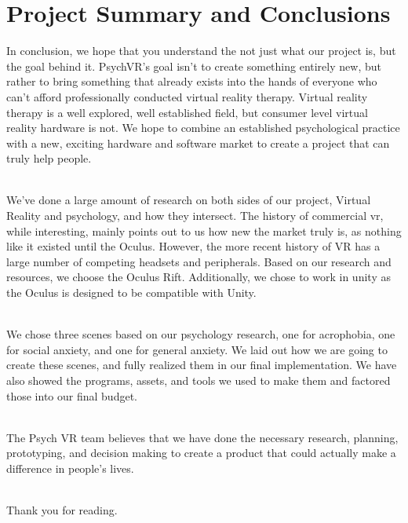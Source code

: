 \documentclass[a4paper,10pt]{article}
\begin{document}
\pagebreak
\section{Project Summary and Conclusions}
In conclusion, we hope that you understand the not just what our project is, but the goal behind it.  PsychVR's goal isn't to create something entirely new, but rather to bring something that already exists into the hands of everyone who can't afford professionally conducted virtual reality therapy.  Virtual reality therapy is a well explored, well established field, but consumer level virtual reality hardware is not.  We hope to combine an established psychological practice with a new, exciting hardware and software market to create a project that can truly help people. 
\par ~\\
We've done a large amount of research on both sides of our project, Virtual Reality and psychology, and how they intersect.  The history of commercial vr, while interesting, mainly points out to us how new the market truly is, as nothing like it existed until the Oculus.  However, the more recent history of VR has a large number of competing headsets and peripherals.  Based on our research and resources, we choose the Oculus Rift.  Additionally, we chose to work in unity as the Oculus is designed to be compatible with Unity.  
\par ~\\
We chose three scenes based on our psychology research, one for acrophobia, one for social anxiety, and one for general anxiety.  We laid out how we are going to create these scenes, and fully realized them in our final implementation. We have also showed the programs, assets, and tools we used to make them and factored those into our final budget.
\par ~\\
The Psych VR team believes that we have done the necessary research, planning, prototyping, and decision making to create a product that could actually make a difference in people's lives.
\par ~\\
Thank you for reading.
\pagebreak

\setcounter{page}{0}
\end{document}
